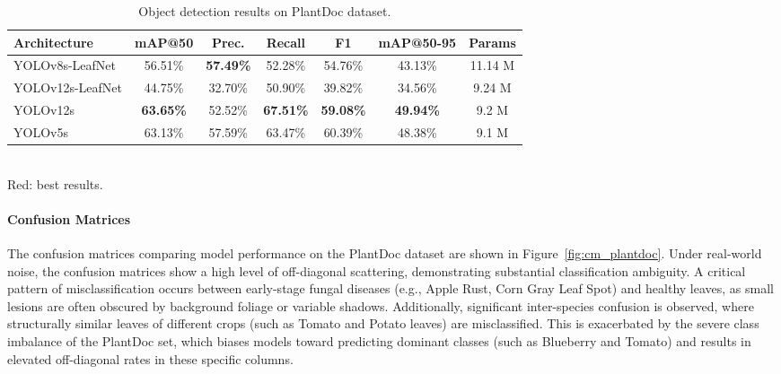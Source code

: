 \documentclass[10pt, conference]{IEEEtran}
\begin{document}
\begin{table}[t]
    \centering
    \caption{Object detection results on PlantDoc dataset.}
    \label{tab:det_plantdoc}
    \setlength{\tabcolsep}{4pt}
    \begin{tabular}{lcccccc}
        \toprule
        \textbf{Architecture} & \textbf{mAP@50} & \textbf{Prec.}
                              & \textbf{Recall} & \textbf{F1}
                              & \textbf{mAP@50-95} & \textbf{Params} \\
        \midrule
        YOLOv8s-LeafNet
            & 56.51\% & \textcolor{bestred}{\textbf{57.49\%}} & 52.28\% & 54.76\%
            & 43.13\% & 11.14 M \\
        YOLOv12s-LeafNet
            & 44.75\% & 32.70\% & 50.90\% & 39.82\% & 34.56\% & 9.24 M \\
        YOLOv12s
            & \textcolor{bestred}{\textbf{63.65\%}} & 52.52\%
            & \textcolor{bestred}{\textbf{67.51\%}}
            & \textcolor{bestred}{\textbf{59.08\%}}
            & \textcolor{bestred}{\textbf{49.94\%}} & 9.2 M \\
        YOLOv5s
            & 63.13\% & 57.59\% & 63.47\% & 60.39\% & 48.38\% & 9.1 M \\
        \bottomrule
    \end{tabular}\\[4pt]
    {\small \textcolor{bestred}{Red}: best results.}
\end{table}

\paragraph{Confusion Matrices}

The confusion matrices comparing model performance on the PlantDoc dataset are shown in Figure~\ref{fig:cm_plantdoc}. Under real-world noise, the confusion matrices show a high level of off-diagonal scattering, demonstrating substantial classification ambiguity. A critical pattern of misclassification occurs between early-stage fungal diseases (e.g., Apple Rust, Corn Gray Leaf Spot) and healthy leaves, as small lesions are often obscured by background foliage or variable shadows. Additionally, significant inter-species confusion is observed, where structurally similar leaves of different crops (such as Tomato and Potato leaves) are misclassified. This is exacerbated by the severe class imbalance of the PlantDoc set, which biases models toward predicting dominant classes (such as Blueberry and Tomato) and results in elevated off-diagonal rates in these specific columns.
\end{document}
